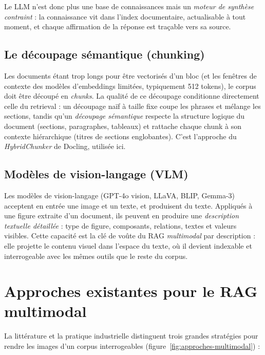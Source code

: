 Le LLM n'est donc plus une base de connaissances mais un \emph{moteur de synthèse
contraint} : la connaissance vit dans l'index documentaire, actualisable à tout moment,
et chaque affirmation de la réponse est traçable vers sa source.


\subsection{Le découpage sémantique (chunking)}

Les documents étant trop longs pour être vectorisés d'un bloc (et les fenêtres de contexte
des modèles d'embeddings limitées, typiquement 512 tokens), le corpus doit être découpé en
\emph{chunks}. La qualité de ce découpage conditionne directement celle du retrieval : un
découpage naïf à taille fixe coupe les phrases et mélange les sections, tandis qu'un
\emph{découpage sémantique} respecte la structure logique du document (sections,
paragraphes, tableaux) et rattache chaque chunk à son contexte hiérarchique (titres de
sections englobantes). C'est l'approche du \emph{HybridChunker} de Docling, utilisée ici.

\subsection{Modèles de vision-langage (VLM)}

Les modèles de vision-langage (GPT-4o vision, LLaVA, BLIP, Gemma-3) acceptent en entrée
une image et un texte, et produisent du texte. Appliqués à une figure extraite d'un
document, ils peuvent en produire une \emph{description textuelle détaillée} : type de
figure, composants, relations, textes et valeurs visibles. Cette capacité est la clé de
voûte du RAG \emph{multimodal} par description : elle projette le contenu visuel dans
l'espace du texte, où il devient indexable et interrogeable avec les mêmes outils que le
reste du corpus.

\section{Approches existantes pour le RAG multimodal}
\label{sec:approches}

La littérature et la pratique industrielle distinguent trois grandes stratégies pour
rendre les images d'un corpus interrogeables (figure~\ref{fig:approches-multimodal}) :

